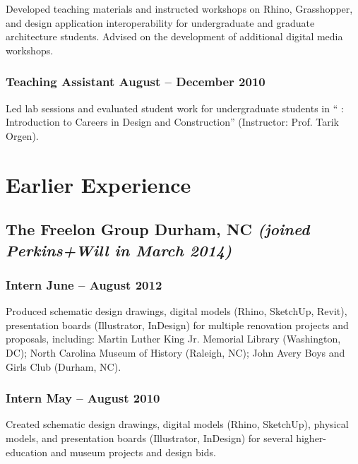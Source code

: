 \documentclass[letterpaper, oneside, 10pt]{article}
\begin{document}
Developed teaching materials and instructed workshops on Rhino, Grasshopper,
and design application interoperability for undergraduate and graduate
architecture students. Advised on the development of additional digital media
workshops.

\subsubsection*{Teaching Assistant\DotSep{0.25em} August -- December 2010}

Led lab sessions and evaluated student work for undergraduate students in
`` : Introduction to Careers in Design and Construction''
(Instructor: Prof. Tarik Orgen).


\section*{Earlier Experience} %

\AdjSectSpace
\suppressfalse

\subsection*{%
  The Freelon Group\DotSep{0.25em} Durham, NC\DotSep{0.25em}%
  \space\textit{(joined Perkins+Will in March 2014)}%
}

\subsubsection*{Intern\DotSep{0.25em} June -- August 2012}

Produced schematic design drawings, digital models (Rhino, SketchUp, Revit),
presentation boards (Illustrator, InDesign) for multiple renovation projects
and proposals, including: Martin Luther King Jr. Memorial Library (Washington,
DC); North Carolina Museum of History (Raleigh, NC); John Avery Boys and Girls
Club (Durham, NC).


\subsubsection*{Intern\DotSep{0.25em} May -- August 2010}

Created schematic design drawings, digital models (Rhino, SketchUp), physical
models, and presentation boards (Illustrator, InDesign) for several
higher-education and museum projects and design bids.
\end{document}
